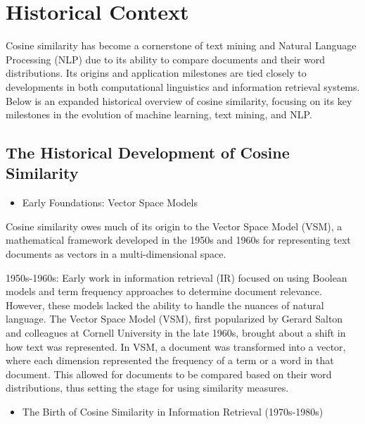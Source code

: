 \documentclass[
  12 pt,
  a4paper,
]{book}
\providecommand{\tightlist}{%
  \setlength{\itemsep}{0pt}\setlength{\parskip}{0pt}}
\numberwithin{equation}{section}
\theoremstyle{plain}      %
\theoremstyle{definition} %
\theoremstyle{remark}     %
\theoremstyle{note}         %
\begin{document}
\newpage

\hypertarget{historical-context-2}{%
\section{Historical Context}\label{historical-context-2}}

Cosine similarity has become a cornerstone of text mining and Natural
Language Processing (NLP) due to its ability to compare documents and
their word distributions. Its origins and application milestones are
tied closely to developments in both computational linguistics and
information retrieval systems. Below is an expanded historical overview
of cosine similarity, focusing on its key milestones in the evolution of
machine learning, text mining, and NLP.

\hypertarget{the-historical-development-of-cosine-similarity}{%
\subsection{The Historical Development of Cosine
Similarity}\label{the-historical-development-of-cosine-similarity}}

\begin{itemize}
\tightlist
\item
  Early Foundations: Vector Space Models
\end{itemize}

Cosine similarity owes much of its origin to the Vector Space Model
(VSM), a mathematical framework developed in the 1950s and 1960s for
representing text documents as vectors in a multi-dimensional space.

1950s-1960s: Early work in information retrieval (IR) focused on using
Boolean models and term frequency approaches to determine document
relevance. However, these models lacked the ability to handle the
nuances of natural language. The Vector Space Model (VSM), first
popularized by Gerard Salton and colleagues at Cornell University in the
late 1960s, brought about a shift in how text was represented. In VSM, a
document was transformed into a vector, where each dimension represented
the frequency of a term or a word in that document. This allowed for
documents to be compared based on their word distributions, thus setting
the stage for using similarity measures.

\begin{itemize}
\tightlist
\item
  The Birth of Cosine Similarity in Information Retrieval (1970s-1980s)
\end{itemize}
\end{document}

